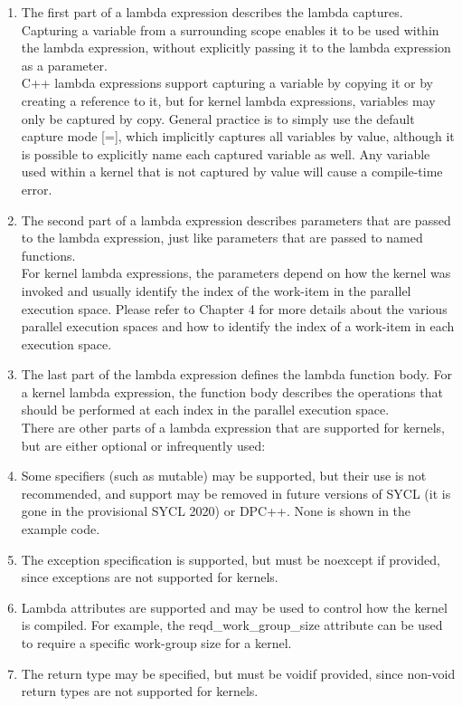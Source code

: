 \begin{enumerate}
	\item The first part of a lambda expression describes the lambda captures. Capturing a variable from a surrounding scope enables it to be used within the lambda expression, without explicitly passing it to the lambda expression as a parameter.\\
	C++ lambda expressions support capturing a variable by copying it or by creating a reference to it, but for kernel lambda expressions, variables may only be captured by copy. General practice is to simply use the default capture mode [=], which implicitly captures all variables by value, although it is possible to explicitly name each captured variable as well. Any variable used within a kernel that is not captured by value will cause a compile-time error.
	\item The second part of a lambda expression describes parameters that are passed to the lambda expression, just like parameters that are passed to named functions.\\
	For kernel lambda expressions, the parameters depend on how the kernel was invoked and usually identify the index of the work-item in the parallel execution space. Please refer to Chapter 4 for more details about the various parallel execution spaces and how to identify the index of a work-item in each execution space.
	\item The last part of the lambda expression defines the lambda function body. For a kernel lambda expression, the function body describes the operations that should be performed at each index in the parallel execution space.\\
	There are other parts of a lambda expression that are supported for kernels, but are either optional or infrequently used:
	\item Some specifiers (such as mutable) may be supported, but their use is not recommended, and support may be removed in future versions of SYCL (it is gone in the provisional SYCL 2020) or DPC++. None is shown in the example code.
	\item The exception specification is supported, but must be noexcept if provided, since exceptions are not supported for kernels.
	\item Lambda attributes are supported and may be used to control how the kernel is compiled. For example, the reqd\_work\_group\_size attribute can be used to require a specific work-group size for a kernel.
	\item The return type may be specified, but must be voidif provided, since non-void return types are not supported for kernels.
\end{enumerate}

